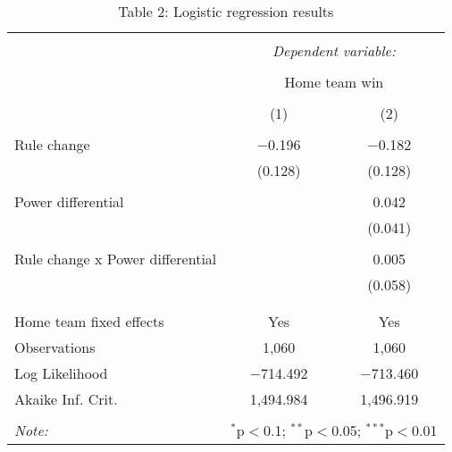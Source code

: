 
\begin{table}[!htbp] \centering 
  \caption{Table 2: Logistic regression results} 
  \label{} 
\begin{tabular}{@{\extracolsep{5pt}}lcc} 
\\[-1.8ex]\hline 
\hline \\[-1.8ex] 
 & \multicolumn{2}{c}{\textit{Dependent variable:}} \\ 
\cline{2-3} 
\\[-1.8ex] & \multicolumn{2}{c}{Home team win} \\ 
\\[-1.8ex] & (1) & (2)\\ 
\hline \\[-1.8ex] 
 Rule change & $-$0.196 & $-$0.182 \\ 
  & (0.128) & (0.128) \\ 
  & & \\ 
 Power differential &  & 0.042 \\ 
  &  & (0.041) \\ 
  & & \\ 
 
                               Rule change x Power differential &  & 0.005 \\ 
  &  & (0.058) \\ 
  & & \\ 
\hline \\[-1.8ex] 
Home team fixed effects & Yes & Yes \\ 
Observations & 1,060 & 1,060 \\ 
Log Likelihood & $-$714.492 & $-$713.460 \\ 
Akaike Inf. Crit. & 1,494.984 & 1,496.919 \\ 
\hline 
\hline \\[-1.8ex] 
\textit{Note:}  & \multicolumn{2}{r}{$^{*}$p$<$0.1; $^{**}$p$<$0.05; $^{***}$p$<$0.01} \\ 
\end{tabular} 
\end{table} 
